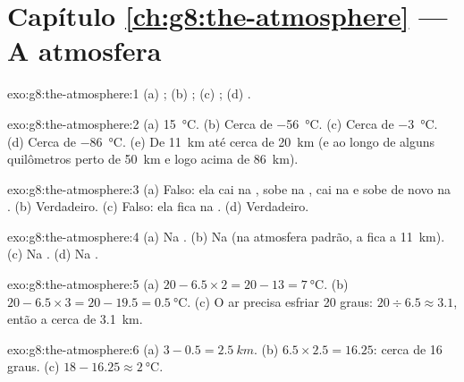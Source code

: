 \section*{Capítulo \ref{ch:g8:the-atmosphere} --- A atmosfera}

\begin{solution}{exo:g8:the-atmosphere:1}
(a) ; (b) ; (c) ; (d) .
\end{solution}

\begin{solution}{exo:g8:the-atmosphere:2}
(a) \qty{15}{\degreeCelsius}. (b) Cerca de \qty{-56}{\degreeCelsius}.
(c) Cerca de \qty{-3}{\degreeCelsius}. (d) Cerca de \qty{-86}{\degreeCelsius}.
(e) De \qty{11}{km} até cerca de \qty{20}{km} (e ao longo de alguns
quilômetros perto de \qty{50}{km} e logo acima de \qty{86}{km}).
\end{solution}

\begin{solution}{exo:g8:the-atmosphere:3}
(a) Falso: ela cai na , sobe na , cai na 
e sobe de novo na . (b) Verdadeiro. (c) Falso: ela fica na
. (d) Verdadeiro.
\end{solution}

\begin{solution}{exo:g8:the-atmosphere:4}
(a) Na . (b) Na  (na atmosfera padrão, a 
fica a \qty{11}{km}). (c) Na . (d) Na .
\end{solution}

\begin{solution}{exo:g8:the-atmosphere:5}
(a) $20 - 6.5 \times 2 = 20 - 13 = \qty{7}{\degreeCelsius}$. (b) $20 -
6.5 \times 3 = 20 - 19.5 = \qty{0.5}{\degreeCelsius}$. (c) O ar precisa
esfriar 20 graus: $20 \div 6.5 \approx 3.1$, então a cerca de
\qty{3.1}{km}.
\end{solution}

\begin{solution}{exo:g8:the-atmosphere:6}
(a) $3 - 0.5 = \qty{2.5}{km}$. (b) $6.5 \times 2.5 = 16.25$: cerca de 16
graus. (c) $18 - 16.25 \approx \qty{2}{\degreeCelsius}$.
\end{solution}

